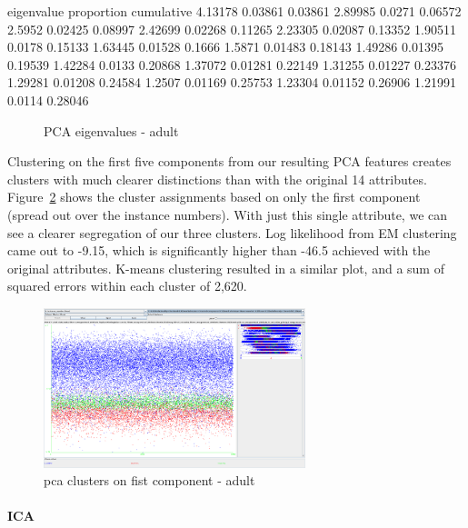 \documentclass{sig-alternate}
\begin{document}
\scriptsize
\begin{verbbox}
eigenvalue  proportion  cumulative
4.13178     0.03861     0.03861
2.89985     0.0271      0.06572
2.5952      0.02425     0.08997
2.42699     0.02268     0.11265
2.23305     0.02087     0.13352
1.90511     0.0178      0.15133
1.63445     0.01528     0.1666 
1.5871      0.01483     0.18143
1.49286     0.01395     0.19539
1.42284     0.0133      0.20868
1.37072     0.01281     0.22149
1.31255     0.01227     0.23376
1.29281     0.01208     0.24584
1.2507      0.01169     0.25753
1.23304     0.01152     0.26906
1.21991     0.0114      0.28046
\end{verbbox}
\normalsize

\begin{figure}[!htbp]
    \centering
    \theverbbox
    \caption{PCA eigenvalues - adult\label{pca-adult}}
\end{figure}

Clustering on the first five components from our resulting PCA features creates clusters with much clearer distinctions than with the original 14 attributes. Figure~\ref{pca-cluster-scatter} shows the cluster assignments based on only the first component (spread out over the instance numbers). With just this single attribute, we can see a clearer segregation of our three clusters. Log likelihood from EM clustering came out to -9.15, which is significantly higher than -46.5 achieved with the original attributes. K-means clustering resulted in a similar plot, and a sum of squared errors within each cluster of 2,620.

\begin{figure}[!htbp]
    \centering
    \includegraphics[width=3in]{part2/adult/pca-cluster-scatter.pdf}
    \caption{pca clusters on fist component - adult\label{pca-cluster-scatter}}
\end{figure} 


\paragraph{ICA}
\end{document}

